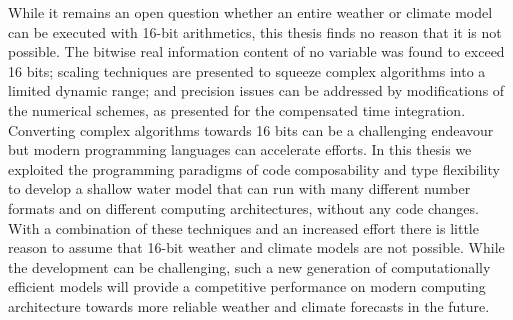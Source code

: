 While it remains an open question whether an entire weather or climate model can be executed with 16-bit arithmetics, this thesis finds no
reason that it is not possible. The bitwise real information content of no variable was found to exceed 16 bits; scaling techniques are
presented to squeeze complex algorithms into a limited dynamic range; and precision issues can be addressed by modifications of the
numerical schemes, as presented for the compensated time integration. Converting complex algorithms towards 16 bits can be a 
challenging endeavour but modern programming languages can accelerate efforts. In this thesis we exploited the programming paradigms
of code composability and type flexibility to develop a shallow water model that can run with many different number formats and on different
computing architectures, without any code changes. With a combination of these techniques and an increased effort there is little reason
to assume that 16-bit weather and climate models are not possible. While the development can be challenging, such a new generation of
computationally efficient models will provide a competitive performance on modern computing architecture towards more reliable weather
and climate forecasts in the future.


